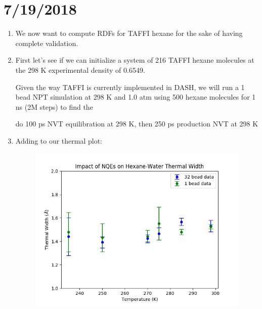 \documentclass[12pt,reqno]{amsart}
\numberwithin{equation}{section}
\begin{document}
\section{7/19/2018}
\begin{enumerate}
\item We now want to compute RDFs for TAFFI hexane for the sake of having complete validation. 
\item First let's see if we can initialize a system of 216 TAFFI hexane molecules at the 298 K experimental density of 0.6549.  


 Given the way TAFFI is currently implemented in DASH, we will run a 1 bead NPT simulation at 298 K and 1.0 atm using 500 hexane molecules for 1 ns (2M steps) to find the 

 do 100 ps NVT equilibration at 298 K, then 250 ps production NVT at 298 K 

\item Adding to our thermal plot:

\begin{figure}[H]
\centering
\includegraphics[scale=0.6]{thermal-width-32bead-vs-1bead-complete}
\end{figure}
\end{enumerate}
\end{document}

